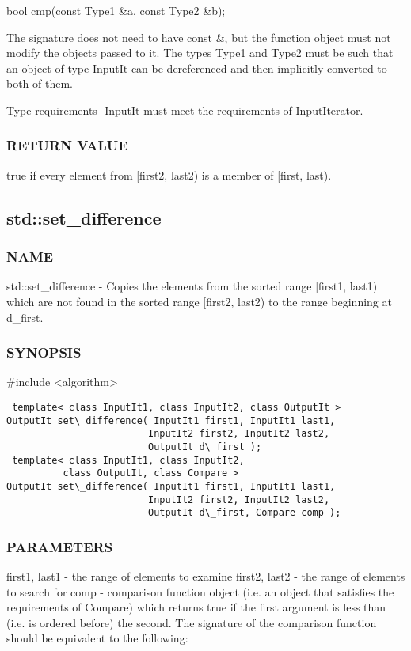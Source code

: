  bool cmp(const Type1 \&a, const Type2 \&b);

The signature does not need to have const \&, but the function object must not modify the objects passed to it.
The types Type1 and Type2 must be such that an object of type InputIt can be dereferenced and then implicitly converted to both of them.

 Type requirements
 -InputIt must meet the requirements of InputIterator.

\subsubsection{RETURN VALUE}
true if every element from [first2, last2) is a member of [first, last).



\subsection{std::set\_difference}

\subsubsection{NAME}
std::set\_difference - Copies the elements from the sorted range [first1, last1) which are not found in the sorted range [first2, last2) to the range beginning at d\_first.

\subsubsection{SYNOPSIS}
\#include <algorithm>

\begin{lstlisting}
 template< class InputIt1, class InputIt2, class OutputIt >
OutputIt set\_difference( InputIt1 first1, InputIt1 last1,
                         InputIt2 first2, InputIt2 last2,
                         OutputIt d\_first );
 template< class InputIt1, class InputIt2,
          class OutputIt, class Compare >
OutputIt set\_difference( InputIt1 first1, InputIt1 last1,
                         InputIt2 first2, InputIt2 last2,
                         OutputIt d\_first, Compare comp );
\end{lstlisting}

\subsubsection{PARAMETERS}
first1, last1 - the range of elements to examine
first2, last2 - the range of elements to search for
comp - comparison function object (i.e. an object that satisfies the requirements of Compare) which returns true if the first argument is less than (i.e. is ordered before) the second.
The signature of the comparison function should be equivalent to the following:


